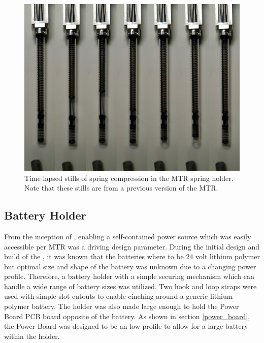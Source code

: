 \begin{figure}[thpb]%
      \centering
      \includegraphics[width=0.8\columnwidth]{tex/img/double_spring_series}
      \caption{Time lapsed stills of spring compression in the MTR spring holder. Note that these stills are from a previous version of the MTR.}
      \label{fig:spring_holder}
\end{figure}

\subsection{Battery Holder}
\label{battery_holder}
From the inception of \SB{}, enabling a self-contained power source which was easily accessible per MTR was a driving design parameter.
During the initial design and build of the \SB{}, it was known that the batteries where to be 24 volt lithium polymer but optimal size and shape of the battery was unknown due to a changing power profile.
Therefore, a battery holder with a simple securing mechanism which can handle a wide range of battery sizes was utilized.
Two hook and loop straps were used with simple slot cutouts to enable cinching around a generic lithium polymer battery.
The holder was also made large enough to hold the Power Board PCB board opposite of the battery.
As shown in section \ref{power_board}, the Power Board was designed to be an low profile to allow for a large battery within the holder.

